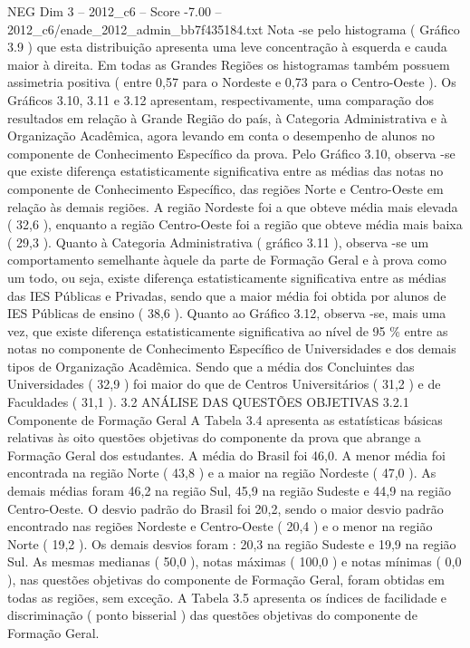\begin{textsample}{NEG Dim 3 – 2012\_c6 – Score -7.00 – 2012\_c6/enade\_2012\_admin\_bb7f435184.txt}
Nota -se pelo histograma ( Gráfico 3.9 ) que esta distribuição apresenta uma leve concentração à esquerda e cauda maior à direita.
Em todas as Grandes Regiões os histogramas também possuem assimetria positiva ( entre 0,57 para o Nordeste e 0,73 para o Centro-Oeste ).
Os Gráficos 3.10, 3.11 e 3.12 apresentam, respectivamente, uma comparação dos resultados em relação à Grande Região do país, à Categoria Administrativa e à Organização Acadêmica, agora levando em conta o desempenho de alunos no componente de Conhecimento Específico da prova.
Pelo Gráfico 3.10, observa -se que existe diferença estatisticamente significativa entre as médias das notas no componente de Conhecimento Específico, das regiões Norte e Centro-Oeste em relação às demais regiões.
A região Nordeste foi a que obteve média mais elevada ( 32,6 ), enquanto a região Centro-Oeste foi a região que obteve média mais baixa ( 29,3 ).
Quanto à Categoria Administrativa ( gráfico 3.11 ), observa -se um comportamento semelhante àquele da parte de Formação Geral e à prova como um todo, ou seja, existe diferença estatisticamente significativa entre as médias das IES Públicas e Privadas, sendo que a maior média foi obtida por alunos de IES Públicas de ensino ( 38,6 ).
Quanto ao Gráfico 3.12, observa -se, mais uma vez, que existe diferença estatisticamente significativa ao nível de 95 \% entre as notas no componente de Conhecimento Específico de Universidades e dos demais tipos de Organização Acadêmica.
Sendo que a média dos Concluintes das Universidades ( 32,9 ) foi maior do que de Centros Universitários ( 31,2 ) e de Faculdades ( 31,1 ). 3.2 ANÁLISE DAS QUESTÕES OBJETIVAS 3.2.1 Componente de Formação Geral A Tabela 3.4 apresenta as estatísticas básicas relativas às oito questões objetivas do componente da prova que abrange a Formação Geral dos estudantes.
A média do Brasil foi 46,0.
A menor média foi encontrada na região Norte ( 43,8 ) e a maior na região Nordeste ( 47,0 ).
As demais médias foram 46,2 na região Sul, 45,9 na região Sudeste e 44,9 na região Centro-Oeste.
O desvio padrão do Brasil foi 20,2, sendo o maior desvio padrão encontrado nas regiões Nordeste e Centro-Oeste ( 20,4 ) e o menor na região Norte ( 19,2 ).
Os demais desvios foram : 20,3 na região Sudeste e 19,9 na região Sul.
As mesmas medianas ( 50,0 ), notas máximas ( 100,0 ) e notas mínimas ( 0,0 ), nas questões objetivas do componente de Formação Geral, foram obtidas em todas as regiões, sem exceção.
A Tabela 3.5 apresenta os índices de facilidade e discriminação ( ponto bisserial ) das questões objetivas do componente de Formação Geral.

\end{textsample}
